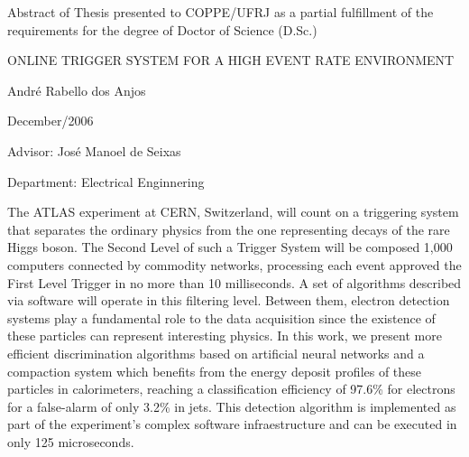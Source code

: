 \clearpage

\noindent
Abstract of Thesis presented to COPPE/UFRJ as a partial fulfillment of the
\linebreak requirements for the degree of Doctor of Science (D.Sc.)

\vspace{1.5cm}

\begin{center}
ONLINE TRIGGER SYSTEM FOR A HIGH EVENT RATE ENVIRONMENT 
\vspace{1cm}

André Rabello dos Anjos
\vspace{1cm}

December/2006
\end{center}
\vspace{2cm}

\noindent
Advisor: José Manoel de Seixas
\vspace{2cm}

\noindent
Department: Electrical Enginnering
\vspace{2cm}

\noindent \begin{summary}{1.2}
\hspace{0.8cm}The ATLAS experiment at CERN, Switzerland, will count on a
triggering system that separates the ordinary physics from the one
representing decays of the rare Higgs boson. The Second Level of such a Trigger
System will be composed 1,000 computers connected by commodity networks,
processing each event approved the First Level Trigger in no more than 10
milliseconds. A set of algorithms described via software will operate in this
filtering level. Between them, electron detection systems play a fundamental
role to the data acquisition since the existence of these particles can
represent interesting physics. In this work, we present more efficient
discrimination algorithms based on artificial neural networks and a compaction
system which benefits from the energy deposit profiles of these particles in
calorimeters, reaching a classification efficiency of 97.6\% for electrons for
a false-alarm of only 3.2\% in jets. This detection algorithm is implemented
as part of the experiment's complex software infraestructure and can be
executed in only 125 microseconds.
\end{summary}
